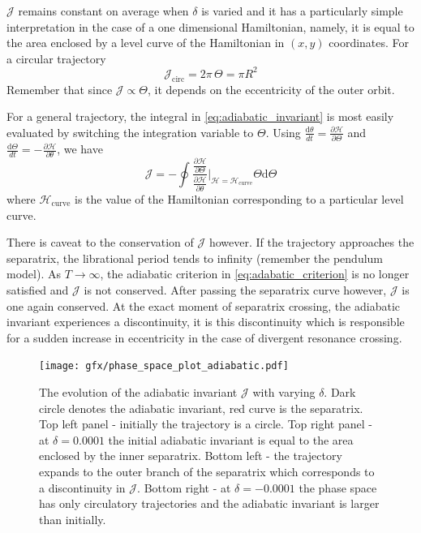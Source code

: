 \documentclass[twoside,openright,titlepage,numbers=noenddot,headinclude,%
                footinclude=true,cleardoublepage=empty,abstractoff, 
                BCOR=5mm,paper=a4,fontsize=11pt,%
                american,%
                ]{scrreprt}%
\begin{document}
$\mathcal{J}$
remains constant on average when $\delta$ is varied and it has a 
particularly simple interpretation in the case of a one dimensional
Hamiltonian, namely, it is equal to the area enclosed by a level
curve of the Hamiltonian in $(x,y)$ coordinates. For a circular trajectory
\begin{equation}
    \mathcal{J}_\text{circ}=2\pi\,\Theta=\pi R^2
    \label{eq:J_circular}
\end{equation}
Remember that since $\mathcal{J}\propto\Theta$, it depends on the 
eccentricity of the outer orbit. 

For a general trajectory, the integral in \cref{eq:adiabatic_invariant}
is most easily evaluated by switching the integration variable to $\Theta$.
Using $\frac{\mathrm{d}\theta}{dt}=\frac{\partial\mathcal{H}}{\partial\Theta}$
and $ \frac{\mathrm{d}\Theta}{dt} =- \frac{\partial\mathcal{H}}{\partial\theta}$,
we have 
\begin{equation}
    \mathcal{J}=-\oint \frac{\frac{\partial\mathcal{H}}{\partial\Theta}}{
        \frac{\partial\mathcal{H}}{\partial\theta}}
    \bigg\rvert_{\mathcal{H}=\mathcal{H}_\text{curve}}\Theta\mathrm{d}\Theta 
\end{equation}
where $\mathcal{H}_\text{curve}$ is the value of the Hamiltonian corresponding
to a particular level curve.

There is caveat to the conservation of $\mathcal{J}$ however. If the trajectory 
approaches
the separatrix, the librational period tends to infinity (remember the pendulum
model). As $T\rightarrow\infty$, the adiabatic criterion in 
\cref{eq:adabatic_criterion} is no longer satisfied and $\mathcal{J}$ is not
conserved. After passing the separatrix curve however, $\mathcal{J}$ is 
one again conserved. At the exact moment of separatrix crossing, the 
adiabatic invariant experiences a discontinuity, it is this discontinuity
which is responsible for a sudden increase in eccentricity in the case
of divergent resonance crossing.
\begin{figure}[htb]
\centering
\texttt{[image: gfx/phase\_space\_plot\_adiabatic.pdf]}
    \caption[Adibatic invariant evolution.]{The evolution of the 
    adiabatic invariant $\mathcal{J}$
    with varying $\delta$.
    Dark circle denotes the adiabatic invariant, red curve is the 
    separatrix. Top left panel - initially the trajectory is a circle.
    Top right panel - at $\delta=0.0001$ the initial adiabatic invariant
    is equal to the area enclosed by the inner separatrix. Bottom left
    - the trajectory expands to the outer branch of the separatrix which
    corresponds to a discontinuity in $\mathcal{J}$. Bottom right -
    at $\delta=-0.0001$ the phase space has only circulatory trajectories
    and the adiabatic invariant is larger than initially.}
\label{fig:phase_space_adiabatic}
\end{figure}
\end{document}
